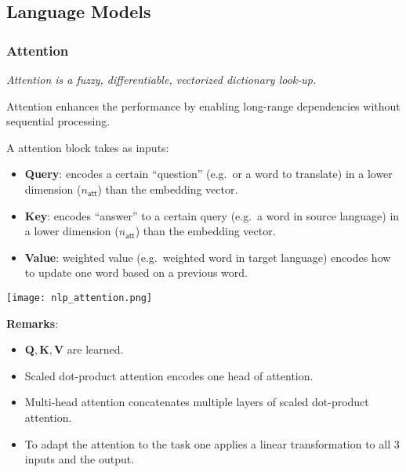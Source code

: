 \subsection{Language Models}
\subsubsection{Attention}
\textit{Attention is a fuzzy, differentiable, vectorized dictionary look-up.}

\newpar{}
Attention enhances the performance by enabling long-range dependencies without sequential processing.

\newpar{}
A attention block takes as inputs:
\begin{itemize}
    \item \textbf{Query}: encodes a certain ``question'' (e.g.\ or a word to translate) in a lower dimension ($n_{\mathsf{att}}$) than the embedding vector. %
    \item \textbf{Key}: encodes ``answer'' to a certain query (e.g.\ a word in source language) in a lower dimension ($n_{\mathsf{att}}$) than the embedding vector. %
    \item \textbf{Value}: weighted value (e.g.\ weighted word in target language) encodes how to update one word based on a previous word. %
\end{itemize}

\newpar{}
\begin{center}
    \texttt{[image: nlp\_attention.png]}
\end{center}
\textbf{Remarks}:
\begin{itemize}
    \item $\mathbf{Q, K, V}$ are learned.
    \item Scaled dot-product attention encodes one head of attention.
    \item Multi-head attention concatenates multiple layers of scaled dot-product attention.
    \item To adapt the attention to the task one applies a linear transformation to all 3 inputs and the output.
\end{itemize}

